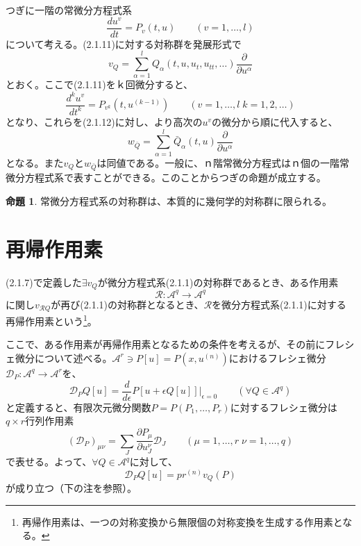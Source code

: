 \documentclass[a4paper, 11pt]{report}
\theoremstyle{definition}
\newtheorem{proposition}{命題}[section]
\begin{document}
 つぎに一階の常微分方程式系
\begin{equation}
\frac{du^v}{dt} = P_v(t,u)\qquad (v=1,\dots,l) %
\end{equation}
について考える。(2.1.11)に対する対称群を発展形式で
\begin{equation}
v_Q = \sum _{\alpha=1}^lQ_\alpha(t,u,u_t,u_{tt},\dots)\frac{\partial }{\partial u^\alpha} %
\end{equation}
とおく。ここで(2.1.11)をｋ回微分すると、
\begin{equation*}
\frac{d^ku^v}{dt^k} = P_{v^k}(t,u^{(k-1)})\qquad (v=1,\dots,l\; k=1,2,\dots)
\end{equation*}
となり、これらを(2.1.12)に対し、より高次の$u^v$の微分から順に代入すると、
\begin{equation*}
w_{\bar{Q}} = \sum_{\alpha=1}^l \bar{Q}_\alpha (t,u)\frac{\partial }{\partial u^\alpha}
\end{equation*}
となる。また$v_{Q}$と$w_{\bar{Q}}$は同値である。一般に、ｎ階常微分方程式はｎ個の一階常微分方程式系で表すことができる。このことからつぎの命題が成立する。

\begin{proposition}
 常微分方程式系の対称群は、本質的に幾何学的対称群に限られる。
\end{proposition}

\section{再帰作用素}

 (2.1.7)で定義した$\exists v_Q$が微分方程式系(2.1.1)の対称群であるとき、ある作用素
\begin{equation*}
\mathcal{R} : \mathcal{A}^q\longrightarrow \mathcal{A}^q
\end{equation*}
に関し$v_{\mathcal{R}Q}$が再び(2.1.1)の対称群となるとき、$\mathcal{R}$を微分方程式系(2.1.1)に対する再帰作用素という\footnote{再帰作用素は、一つの対称変換から無限個の対称変換を生成する作用素となる。}。

 ここで、ある作用素が再帰作用素となるための条件を考えるが、その前にフレシェ微分について述べる。$\mathcal{A}^r\ni P[u]=P(x,u^{(n)})$におけるフレシェ微分$\mathcal{D}_P:\mathcal{A}^q\longrightarrow \mathcal{A}^r$を、
\begin{equation*}
\mathcal{D}_PQ[u] = \frac{d}{d\epsilon}P[u + \epsilon Q[u]]\vert _{\epsilon=0}\qquad (\forall Q \in \mathcal{A}^q)
\end{equation*}
と定義すると、有限次元微分関数$P=P(P_1,\dots,P_r)$に対するフレシェ微分は$q\times r$行列作用素
\begin{equation*}
(\mathcal{D}_P)_{\mu\nu} = \sum _J\frac{\partial P_\mu}{\partial u^\nu_J}\mathcal{D}_J\qquad (\mu=1,\dots,r\; \nu=1,\dots,q)
\end{equation*}
で表せる。よって、$\forall Q\in \mathcal{A}^q$に対して、
\begin{equation}
\mathcal{D}_PQ[u] = pr^{(n)}v_Q (P) %
\end{equation}
が成り立つ（下の注を参照）。
\end{document}
